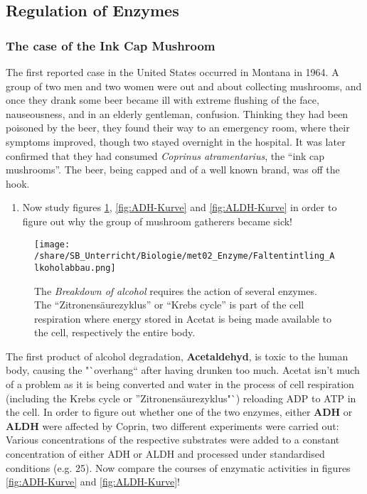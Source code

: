 	 \areaset[0cm]{11.5cm}{27.4cm}

\subsection{Regulation of Enzymes}
\subsubsection{The case of the Ink Cap Mushroom}

The first reported case in the United States occurred in Montana in 1964.  A group of two men and two women were out and about collecting mushrooms, and once they drank some beer became ill with extreme flushing of the face, nauseousness, and in an elderly gentleman, confusion.  Thinking they had been poisoned by the beer, they found their way to an emergency room, where their symptoms improved, though two stayed overnight in the hospital.  It was later confirmed that they had consumed \textit{Coprinus atramentarius}, the "`ink cap mushrooms"'.  The beer, being capped and of a well known brand, was off the hook.

\begin{enumerate}[itemsep=1.5em, leftmargin=*]
\item  Now study figures  \ref{fig:Alkoholabbaustufen}, \ref{fig:ADH-Kurve} and \ref{fig:ALDH-Kurve} in order to figure out why the group of mushroom gatherers became sick!
\end{enumerate}

		\begin{figure}[htp]
		  \texttt{[image: /share/SB\_Unterricht/Biologie/met02\_Enzyme/Faltentintling\_Alkoholabbau.png]}
		  \caption[Alkoholabbauweg aus PdN 5/58 2009]{The \emph{Breakdown of alcohol} requires the action of several enzymes. The "`Zitronensäurezyklus"' or "`Krebs cycle"' is part of the cell respiration where energy stored in Acetat is being made available to the cell, respectively the entire body. }
		  \label{fig:Alkoholabbaustufen}
		\end{figure}

The first product of alcohol degradation, \textbf{Acetaldehyd}, is toxic to the human body, causing the "`overhang"` after having drunken too much. Acetat isn't much of a problem as it is being converted   and water in the process of cell respiration (including the Krebs cycle or "'Zitronensäurezyklus"`) reloading ADP to ATP in the cell. In order to figure out whether one of the two enzymes, either \textbf{ADH} or \textbf{ALDH} were affected by Coprin, two different experiments were carried out: Various concentrations of the respective substrates were added to a constant concentration of either ADH or ALDH and processed under standardised conditions (e.g. 25\degreecelsius). Now compare the courses of enzymatic activities in figures \ref{fig:ADH-Kurve} and \ref{fig:ALDH-Kurve}!


